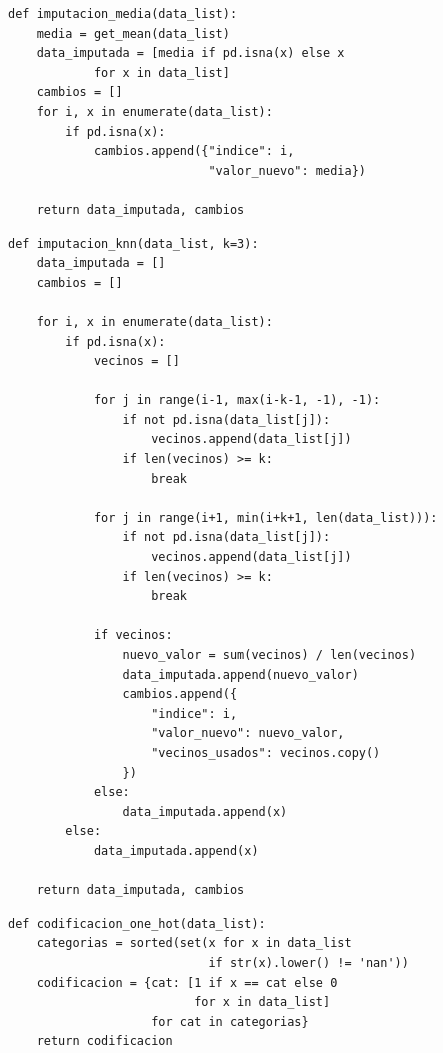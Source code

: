 \documentclass[12pt]{article}
\begin{document}

\begin{lstlisting}[caption=Imputacion por media, label=lst:media]
def imputacion_media(data_list):
    media = get_mean(data_list)
    data_imputada = [media if pd.isna(x) else x 
            for x in data_list]
    cambios = []
    for i, x in enumerate(data_list):
        if pd.isna(x):
            cambios.append({"indice": i, 
                            "valor_nuevo": media})

    return data_imputada, cambios
\end{lstlisting}


\begin{lstlisting}[caption=Imputacion por vecinos mas cercanos (KNN), label=lst:knn]
def imputacion_knn(data_list, k=3):
    data_imputada = []
    cambios = []

    for i, x in enumerate(data_list):
        if pd.isna(x):
            vecinos = []

            for j in range(i-1, max(i-k-1, -1), -1):
                if not pd.isna(data_list[j]):
                    vecinos.append(data_list[j])
                if len(vecinos) >= k:
                    break

            for j in range(i+1, min(i+k+1, len(data_list))):
                if not pd.isna(data_list[j]):
                    vecinos.append(data_list[j])
                if len(vecinos) >= k:
                    break

            if vecinos:
                nuevo_valor = sum(vecinos) / len(vecinos)
                data_imputada.append(nuevo_valor)
                cambios.append({
                    "indice": i,
                    "valor_nuevo": nuevo_valor,
                    "vecinos_usados": vecinos.copy()
                })
            else:
                data_imputada.append(x)
        else:
            data_imputada.append(x)

    return data_imputada, cambios
\end{lstlisting}

\begin{lstlisting}[caption=Codificacion One-Hot, label=lst:onehot]
def codificacion_one_hot(data_list):
    categorias = sorted(set(x for x in data_list 
                            if str(x).lower() != 'nan'))
    codificacion = {cat: [1 if x == cat else 0 
                          for x in data_list] 
                    for cat in categorias}
    return codificacion
\end{lstlisting}
\end{document}
